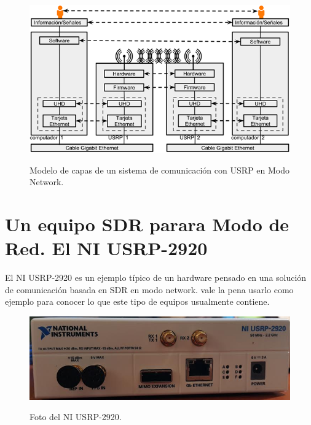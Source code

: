 \begin{figure}[h!]
	\captionsetup{justification = raggedright, singlelinecheck = false}
	\caption{Modelo de capas de un sistema de comunicación con USRP en Modo Network.} 
	\centering
	\includegraphics[scale=0.8]{Imagenes/Modelo-capas.png}
	\label{fig:Modelo-capas}
\end{figure}


\section{Un equipo SDR parara Modo de Red. El NI USRP-2920}

El NI USRP-2920 es un ejemplo típico de un hardware pensado en una solución de comunicación basada en SDR en modo network. vale la pena usarlo como ejemplo para conocer lo que este tipo de equipos usualmente contiene. \\

\begin{figure}[h!]
	\captionsetup{justification = raggedright, singlelinecheck = false}
	\caption{Foto del NI USRP-2920.} 
	\centering
	\includegraphics[scale=0.8]{Imagenes/USRP-2920.png}
	\label{fig:USRP-2920}
\end{figure}

